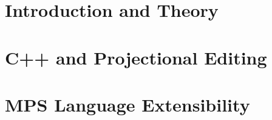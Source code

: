 \documentclass[11pt,a4paper,bibtotoc,idxtotoc,headsepline,footsepline,footexclude,BCOR12mm,DIV13,hidelinks]{scrbook}
\begin{document}
	\frontmatter
	
	
	
%	
%	
	
	
%	
	\clearemptydoublepage
	
	
	
	
	
	
	
	
	

	\tableofcontents
  
  

	\mainmatter
	
	
		\part[Introduction and Theory]{Introduction and Theory}
		\label{part:intro}
		
		
		
		\part[C++ and Projectional Editing]{C++ and Projectional Editing}
		\label{part:implementation}
		
		
		
		
		\part[MPS Language Extensibility]{MPS Language Extensibility}
		\label{part:extensibility}
		
		
				
		
\end{document}
